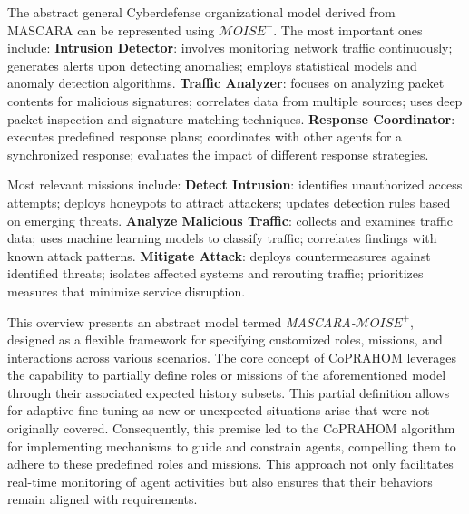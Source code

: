 \documentclass[conference]{IEEEtran}
\newcounter{relation}
\begin{document}
The abstract general Cyberdefense organizational model derived from MASCARA can be represented using $\mathcal{M}OISE^+$. The most important ones include:
%
%
%
\textbf{Intrusion Detector}: involves monitoring network traffic continuously; generates alerts upon detecting anomalies; employs statistical models and anomaly detection algorithms.
%
\textbf{Traffic Analyzer}: focuses on analyzing packet contents for malicious signatures; correlates data from multiple sources; uses deep packet inspection and signature matching techniques.
%
\textbf{Response Coordinator}: executes predefined response plans; coordinates with other agents for a synchronized response; evaluates the impact of different response strategies.


Most relevant missions include:
%
\textbf{Detect Intrusion}: identifies unauthorized access attempts; deploys honeypots to attract attackers; updates detection rules based on emerging threats.
%
\textbf{Analyze Malicious Traffic}: collects and examines traffic data; uses machine learning models to classify traffic; correlates findings with known attack patterns.
%
\textbf{Mitigate Attack}: deploys countermeasures against identified threats; isolates affected systems and rerouting traffic; prioritizes measures that minimize service disruption.

This overview presents an abstract model termed \textit{MASCARA-$\mathcal{M}OISE^+$}, designed as a flexible framework for specifying customized roles, missions, and interactions across various scenarios. The core concept of CoPRAHOM leverages the capability to partially define roles or missions of the aforementioned model through their associated expected history subsets. This partial definition allows for adaptive fine-tuning as new or unexpected situations arise that were not originally covered. Consequently, this premise led to the CoPRAHOM algorithm for implementing mechanisms to guide and constrain agents, compelling them to adhere to these predefined roles and missions. This approach not only facilitates real-time monitoring of agent activities but also ensures that their behaviors remain aligned with requirements.
\end{document}
